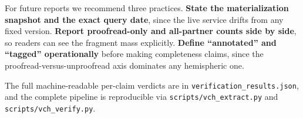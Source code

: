 \documentclass[11pt]{article}
\newcommand{\key}[1]{\textbf{#1}}
\begin{document}
For future reports we recommend three practices. \key{State the materialization snapshot
and the exact query date}, since the live service drifts from any fixed version. \key{Report
proofread-only and all-partner counts side by side}, so readers can see the fragment mass
explicitly. \key{Define ``annotated'' and ``tagged'' operationally} before making
completeness claims, since the proofread-versus-unproofread axis dominates any
hemispheric one.

The full machine-readable per-claim verdicts are in
\texttt{verification\_results.json}, and the complete pipeline is reproducible via
\texttt{scripts/vch\_extract.py} and \texttt{scripts/vch\_verify.py}.
\end{document}
